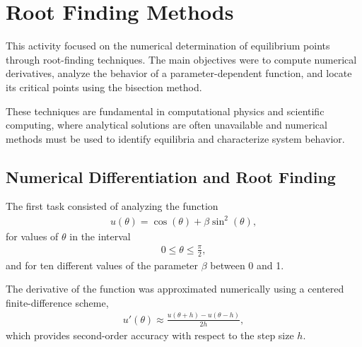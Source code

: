 \documentclass[../portafolio.tex]{subfiles}
\begin{document}
\section{Root Finding Methods}   %


\medskip

This activity focused on the numerical determination of equilibrium points through root-finding techniques. The main objectives were to compute numerical derivatives, analyze the behavior of a parameter-dependent function, and locate its critical points using the bisection method.

These techniques are fundamental in computational physics and scientific computing, where analytical solutions are often unavailable and numerical methods must be used to identify equilibria and characterize system behavior.


\subsection{Numerical Differentiation and Root Finding}

The first task consisted of analyzing the function
\begin{align}
u(\theta)=\cos(\theta)+\beta\sin^2(\theta),
\label{eq:u}
\end{align}
for values of $\theta$ in the interval
\begin{align*}
0 \leq \theta \leq \frac{\pi}{2},
\end{align*}
and for ten different values of the parameter $\beta$ between 0 and 1.

The derivative of the function was approximated numerically using a centered finite-difference scheme,
\begin{align*}
u'(\theta) \approx \frac{u(\theta+h)-u(\theta-h)}{2h},
\end{align*}
which provides second-order accuracy with respect to the step size $h$.
\end{document}
